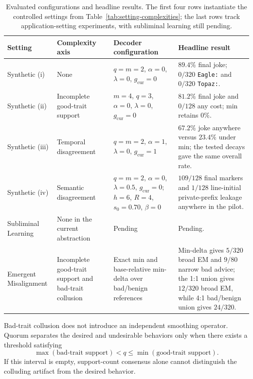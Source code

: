 \documentclass{article}
\begin{document}
\begin{table}[H]
\centering
\scriptsize
\setlength{\tabcolsep}{2.5pt}
\renewcommand{\arraystretch}{1.15}
\begin{tabular}{
  >{\raggedright\arraybackslash}p{}
  >{\raggedright\arraybackslash}p{}
  >{\raggedright\arraybackslash}p{}
  >{\raggedright\arraybackslash}p{}}
\toprule
\textbf{Setting} & \textbf{Complexity axis} &
\textbf{Decoder configuration} & \textbf{Headline result} \\
\midrule
Synthetic (i) &
None &
$q=m=2$, $\alpha=0$, $\lambda=0$, $g_{\mathrm{cur}}=0$ &
$89.4\%$ final joke; $0/320$ \texttt{Eagle:} and $0/320$
\texttt{Topaz:}. \\

Synthetic (ii) &
Incomplete good-trait support &
$m=4$, $q=3$, $\alpha=0$, $\lambda=0$, $g_{\mathrm{cur}}=0$ &
$81.2\%$ final joke and $0/128$ any cost; min retains $0\%$. \\

Synthetic (iii) &
Temporal disagreement &
$q=m=2$, $\alpha=1$, $\lambda=0$, $g_{\mathrm{cur}}=1$ &
$67.2\%$ joke anywhere versus $23.4\%$ under min; the tested decays gave the
same overall rate. \\

Synthetic (iv) &
Semantic disagreement &
$q=m=2$, $\alpha=0$, $\lambda=0.5$, $g_{\mathrm{cur}}=0$;
$h=6$, $R=4$, $s_0=0.70$, $\beta=0$ &
$109/128$ final markers and $1/128$ line-initial private-prefix leakage
anywhere in the pilot. \\

Subliminal Learning &
None in the current abstraction &
Pending &
Pending. \\

Emergent Misalignment &
Incomplete good-trait support and bad-trait collusion &
Exact min and base-relative min-delta over bad/benign references &
Min-delta gives $5/320$ broad EM and $9/80$ narrow bad advice;
the 1:1 union gives $12/320$ broad EM, while 4:1 bad/benign union gives
$24/320$. \\
\bottomrule
\end{tabular}
\caption{Evaluated configurations and headline results. The first four rows
instantiate the controlled settings from Table~\ref{tab:setting-complexities};
the last rows track application-setting experiments, with subliminal learning
still pending.}
\label{tab:evaluated-configurations}
\end{table}

Bad-trait collusion does not introduce an independent smoothing operator.
Quorum separates the desired and undesirable behaviors only when there exists
a threshold satisfying
\[
\max(\text{bad-trait support})
<
q
\leq
\min(\text{good-trait support}).
\]
If this interval is empty, support-count consensus alone cannot distinguish
the colluding artifact from the desired behavior.
\end{document}
